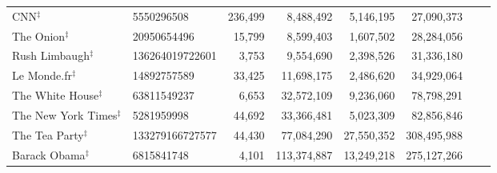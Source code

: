 \begin{longtable}{llrrrrrr}
                                    CNN$^\ddagger$ &       5550296508 & 236,499 &   8,488,492 &  5,146,195 &  27,090,373 &             &           \\
                              The Onion$^\ddagger$ &      20950654496 &  15,799 &   8,599,403 &  1,607,502 &  28,284,056 &             &           \\
                          Rush Limbaugh$^\ddagger$ &  136264019722601 &   3,753 &   9,554,690 &  2,398,526 &  31,336,180 &             &           \\
                            Le Monde.fr$^\ddagger$ &      14892757589 &  33,425 &  11,698,175 &  2,486,620 &  34,929,064 &             &           \\
                        The White House$^\ddagger$ &      63811549237 &   6,653 &  32,572,109 &  9,236,060 &  78,798,291 &             &           \\
                     The New York Times$^\ddagger$ &       5281959998 &  44,692 &  33,366,481 &  5,023,309 &  82,856,846 &             &           \\
                          The Tea Party$^\ddagger$ &  133279166727577 &  44,430 &  77,084,290 & 27,550,352 & 308,495,988 &             &           \\
                           Barack Obama$^\ddagger$ &       6815841748 &   4,101 & 113,374,887 & 13,249,218 & 275,127,266 &             &           \\
\end{longtable}
